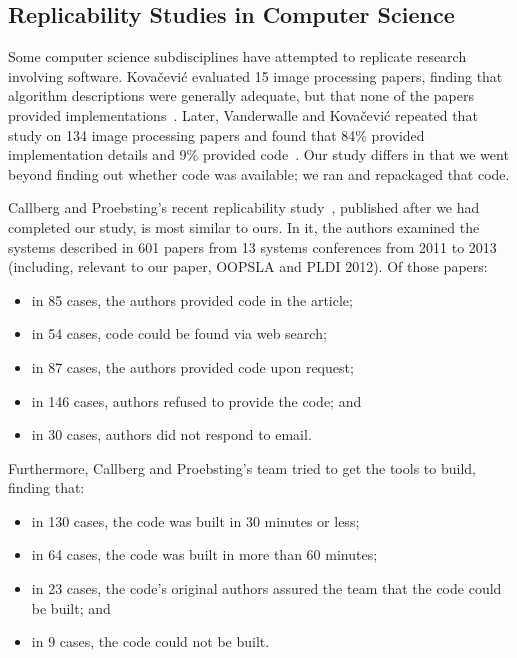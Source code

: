 \documentclass[10pt,conference]{IEEEtran}
\begin{document}
\subsection{Replicability Studies in Computer Science}

Some computer science subdisciplines have attempted to replicate
research involving software.
Kova{\v{c}}evi{\'c} evaluated 15 image processing papers,
finding that algorithm descriptions were
generally adequate, but that none of the papers provided
implementations~\cite{kovacevic2007encourage}.
Later, Vanderwalle and Kova{\v{c}}evi{\'c} repeated that study on 134 
image processing papers and found that 84\% provided implementation details
and 9\% provided code~\cite{vandewalle2009reproducible}. 
Our study differs in that we went beyond finding out whether code was available;
we ran and repackaged that code.

Callberg and Proebsting's recent replicability study~\cite{collberg2016repeatability,proebsting2015repeatability},
published after we had completed our study, is most similar to ours. 
In it, the authors examined the systems described in 
601 papers from 13 systems conferences from 2011 to 2013
(including, relevant to our paper, OOPSLA and PLDI 2012).
Of those papers:

\begin{itemize}   
\item in 85 cases, the authors provided code in the article; 
\item in 54 cases, code could be found via web search;
\item in 87 cases, the authors provided code upon request;
\item in 146 cases, authors refused to provide the code; and
\item in 30 cases, authors did not respond to email.
\end{itemize}

\noindent
Furthermore, Callberg and Proebsting's team tried to get the tools to build, finding
that:

\begin{itemize} 
\item in 130 cases, the code was built in 30 minutes or less;
\item in 64 cases, the code was built in more than 60 minutes;
\item in 23 cases, the code's original authors assured the team that the code could be
			built; and
\item in 9 cases, the code could not be built.
\end{itemize}
\end{document}
